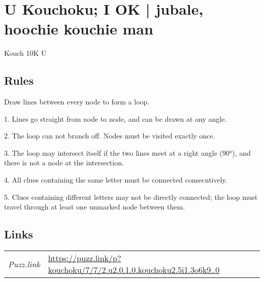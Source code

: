 \section[U Kouchoku; I OK | jubale, hoochie kouchie man {[\emph{Kouchoku}]}]{U Kouchoku; I OK | {\normalfont jubale, hoochie kouchie man}}
\label{sec:20-u-kouchoku-i-ok-jubale-hoochie-kouchie-man}
Kouch 10K U
\subsection*{Rules}
\begin{markdown}
Draw lines between every node to form a loop.



1. Lines go straight from node to node, and can be drawn at any angle.



2. The loop can not branch off. Nodes must be visited exactly once.



3. The loop may intersect itself if the two lines meet at a right angle (90°), and there is not a node at the intersection.



4. All clues containing the same letter must be connected consecutively.



5. Clues containing different letters may not be directly connected; the loop must travel through at least one unmarked node between them.
\end{markdown}
\subsection*{Links}
\begin{tabularx}{\textwidth}{l X}
\emph{Puzz.link} & \url{https://puzz.link/p?kouchoku/7/7/2.u2.0.1.0.kouchoku2.5i1.3o6k9..0} \\
\end{tabularx}
\pagebreak

